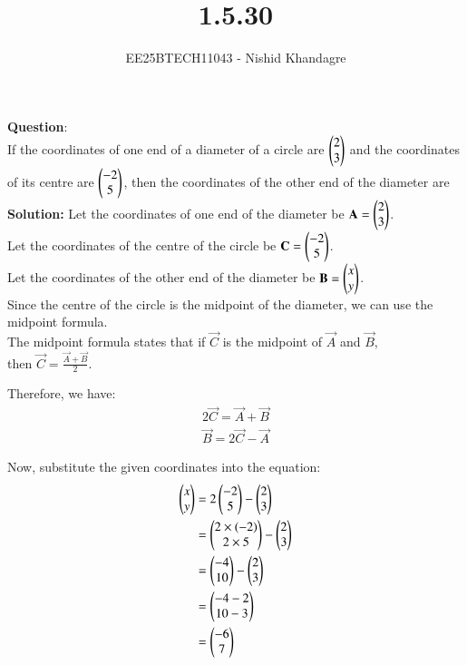 \documentclass[journal]{IEEEtran}
\title{1.5.30}
\author{EE25BTECH11043 - Nishid Khandagre} %
\begin{document}
\maketitle

\renewcommand{\thefigure}{\theenumi}
\renewcommand{\thetable}{\theenumi}


\textbf{Question}:\\
If the coordinates of one end of a diameter of a circle are $\begin{pmatrix}2\\3\end{pmatrix}$ and the coordinates of its centre are $\begin{pmatrix}-2\\5\end{pmatrix}$, then the coordinates of the other end of the diameter are
\\

\textbf{Solution: }
Let the coordinates of one end of the diameter be $\mathbf{A} = \begin{pmatrix}2 \\ 3\end{pmatrix}$.\\
Let the coordinates of the centre of the circle be $\mathbf{C} = \begin{pmatrix}-2 \\ 5\end{pmatrix}$.\\
Let the coordinates of the other end of the diameter be $\mathbf{B} = \begin{pmatrix}x \\ y\end{pmatrix}$.\\

Since the centre of the circle is the midpoint of the diameter, we can use the midpoint formula.\\

The midpoint formula states that if $\vec{C}$ is the midpoint of $\vec{A}$ and $\vec{B}$, \\


then $\vec{C} = \frac{\vec{A} + \vec{B}}{2}$.


Therefore, we have: 
\begin{align}
2\vec{C} = \vec{A} + \vec{B} \\
\vec{B} = 2\vec{C} - \vec{A}
\end{align}


Now, substitute the given coordinates into the equation:
\begin{align}
\begin{pmatrix}x \\ y\end{pmatrix} &= 2 \begin{pmatrix}-2 \\ 5\end{pmatrix} - \begin{pmatrix}2 \\ 3\end{pmatrix} \\
&= \begin{pmatrix}2 \times (-2) \\ 2 \times 5\end{pmatrix} - \begin{pmatrix}2 \\ 3\end{pmatrix} \\
&= \begin{pmatrix}-4 \\ 10\end{pmatrix} - \begin{pmatrix}2 \\ 3\end{pmatrix} \\
&= \begin{pmatrix}-4 - 2 \\ 10 - 3\end{pmatrix} \\
&= \begin{pmatrix}-6 \\ 7\end{pmatrix}
\end{align}
\end{document}
